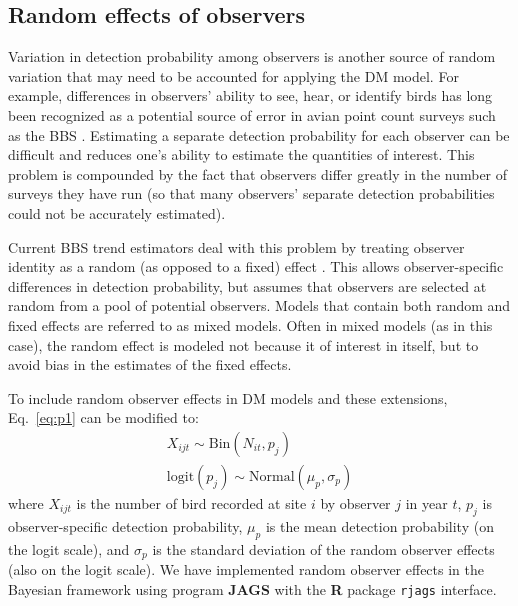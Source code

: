 \documentclass[12pt]{article}
\begin{document}
\subsection{Random effects of observers}

Variation in detection probability among observers is another
source of random variation that may need to be accounted for applying
the DM model. For example, differences in observers' ability to see,
hear, or identify birds has long been recognized as a potential source of error
in avian point count surveys such as the BBS 
\citep{robbins_etal:1986,diefenbach_etal:2003,sauer_etal:1994auk,alldredge_etal:2007auk,campbell_francis:2011}.
Estimating a separate detection probability for each observer
can be difficult and reduces one's ability to estimate the quantities
of interest.  This problem is compounded by the fact that
observers differ greatly in the number of surveys they have
run (so that many observers' separate detection probabilities
could not be accurately estimated).

Current BBS trend estimators deal with this problem by
treating observer identity as a random (as opposed to a fixed)
effect \citep{link_sauer:2002,sauer_link:2011}.
This allows observer-specific differences in detection probability,
but assumes that observers are selected at random from a pool
of potential observers.  Models that contain both random and
fixed effects are referred to as mixed models.  Often in mixed
models (as in this case), the random effect is modeled not
because it of interest in itself, but to avoid bias in the
estimates of the fixed effects.

To include random observer effects in DM models and these
extensions, Eq.~\ref{eq:p1} can be modified to:
\begin{gather}
X_{ijt} \sim \mathrm{Bin}(N_{it}, p_j) \nonumber \\
\mathrm{logit}(p_j) \sim \mathrm{Normal}(\mu_p, \sigma_p)
\label{eq:pobs}
\end{gather}
where $X_{ijt}$ is the number of bird recorded at site $i$ by
observer $j$ in year $t$, $p_j$ is observer-specific detection probability,
$\mu_p$ is the mean detection probability (on the logit scale), and $\sigma_p$ is
the standard deviation of the random observer effects (also on the logit scale). 
We have implemented random observer effects in the Bayesian
framework using program \textbf{JAGS} \citep[version 3.2.0]{plummer:2003}
with the \textbf{R} package \texttt{rjags} \citep{plummer:2011,R-2012} interface.
\end{document}
